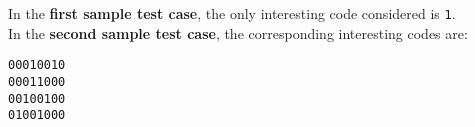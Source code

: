 

\Examples
\begin{example}
%
%
\end{example}


\Explanation
In the \textbf{first sample test case}, the only interesting code considered is \texttt{1}.\\[2mm]
In the \textbf{second sample test case}, the corresponding interesting codes are:
\begin{center}
	\texttt{00010010\\
	00011000\\
	00100100\\
	01001000}
\end{center}
